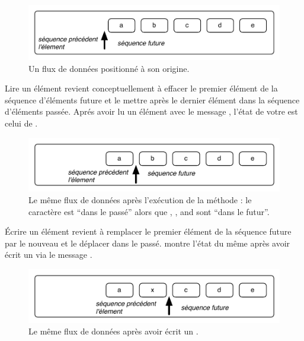 \documentclass[a4paper,10pt,twoside]{book}
\begin{document}
\begin{figure}[ht]
\centerline{\includegraphics[scale=0.5]{_abcdeStef}}
\caption{Un flux de données positionné à son origine.}
\vspace{.2in}
\end{figure}

Lire un élément revient conceptuellement à effacer le premier élément de la séquence 
d'éléments future et le mettre après le dernier élément dans la séquence d'éléments passée.
Aprés avoir lu un élément avec le message , l'état de votre \stream est celui de .

\begin{figure}[ht]
\centerline{\includegraphics[scale=0.5]{a_bcdeStef}}
\caption{Le même flux de données après l'exécution de la méthode : le caractère  est ``dans le passé'' alors que , ,  and  sont ``dans le futur''.}
\vspace{.2in}
\end{figure}

Écrire un élément revient à remplacer le premier élément de la séquence future par le nouveau et le déplacer dans le passé.  montre l'état du même \stream après avoir écrit un  via le message  .

\begin{figure}[h!t]
\centerline{\includegraphics[scale=0.5]{ax_cdeStef}}
\caption{Le même flux de données après avoir écrit un .}
\vspace{.2in}
\end{figure}
\end{document}
